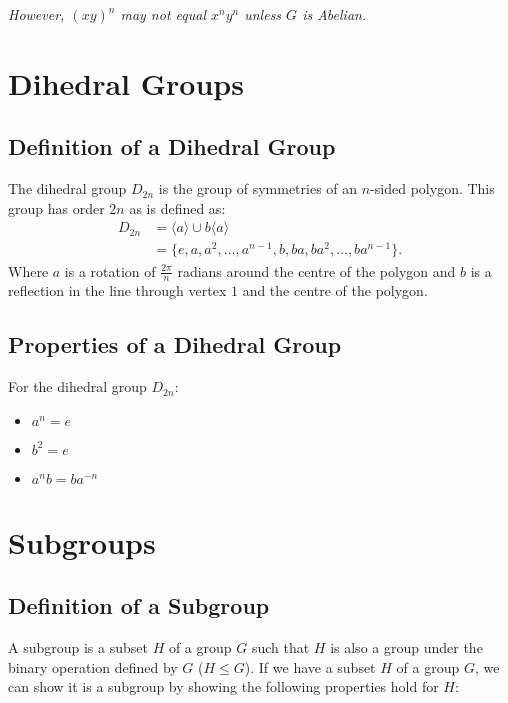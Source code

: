 \documentclass[a4paper, 12pt, twoside]{article}
\begin{document}
\textit{However, $(xy)^n$ may not equal $x^ny^n$ unless $G$ is Abelian.}

\section{Dihedral Groups}

\subsection{Definition of a Dihedral Group}

The dihedral group $D_{2n}$ is the group of symmetries of an $n$-sided polygon.
This group has order $2n$ as is defined as:
\begin{align*}
      D_{2n} & = \langle a \rangle \cup b\langle a \rangle                        \\
             & = \{e, a, a^2, \ldots, a^{n - 1}, b, ba, ba^2, \ldots, ba^{n - 1}\}.
\end{align*}
Where $a$ is a rotation of $\frac{2\pi}{n}$ radians around the centre of the
polygon and $b$ is a reflection in the line through vertex $1$ and the centre
of the polygon.

\subsection{Properties of a Dihedral Group}

For the dihedral group $D_{2n}$:

\begin{itemize}
      \item $a^n = e$
      \item $b^2 = e$
      \item $a^nb = ba^{-n}$
\end{itemize}

\section{Subgroups}

\subsection{Definition of a Subgroup}

A subgroup is a subset $H$ of a group $G$ such that $H$ is also a
group under the binary operation defined by $G$ ($H \leq G$). If we have a subset
$H$ of a group $G$, we can show it is a subgroup by showing the
following properties hold for $H$:
\end{document}
